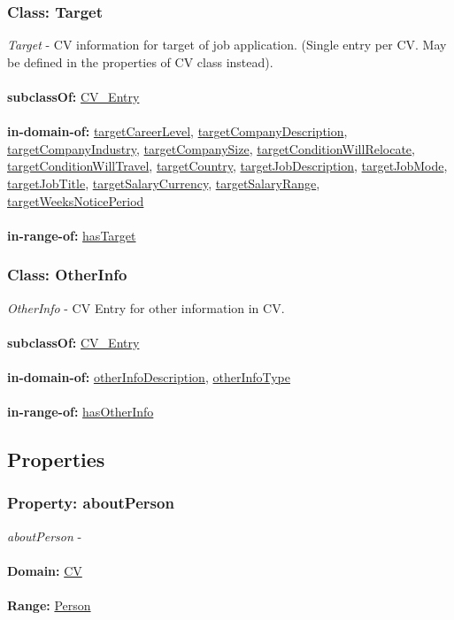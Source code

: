 \documentclass[a4paper,12pt]{article}
\numberwithin{equation}{section}
\begin{document}
\subsubsection{Class: Target}\hypertarget{Target}{}
\textit{Target} - CV information for target of job application. (Single entry per CV. May be defined in the properties of CV class instead).
\\\\
\textbf{subclassOf:} \hyperlink{CV\_Entry}{CV\_Entry}
\\\\
\textbf{in-domain-of:} \hyperlink{targetCareerLevel}{targetCareerLevel}, \hyperlink{targetCompanyDescription}{targetCompanyDescription}, \hyperlink{targetCompanyIndustry}{targetCompanyIndustry}, \hyperlink{targetCompanySize}{targetCompanySize}, \hyperlink{targetConditionWillRelocate}{targetConditionWillRelocate}, \hyperlink{targetConditionWillTravel}{targetConditionWillTravel}, \hyperlink{targetCountry}{targetCountry}, \hyperlink{targetJobDescription}{targetJobDescription}, \hyperlink{targetJobMode}{targetJobMode}, \hyperlink{targetJobTitle}{targetJobTitle}, \hyperlink{targetSalaryCurrency}{targetSalaryCurrency}, \hyperlink{targetSalaryRange}{targetSalaryRange}, \hyperlink{targetWeeksNoticePeriod}{targetWeeksNoticePeriod}
\\\\
\textbf{in-range-of:} \hyperlink{hasTarget}{hasTarget}

\subsubsection{Class: OtherInfo}\hypertarget{OtherInfo}{}
\textit{OtherInfo} - CV Entry for other information in CV.
\\\\
\textbf{subclassOf:} \hyperlink{CV\_Entry}{CV\_Entry}
\\\\
\textbf{in-domain-of:} \hyperlink{otherInfoDescription}{otherInfoDescription}, \hyperlink{otherInfoType}{otherInfoType}
\\\\
\textbf{in-range-of:} \hyperlink{hasOtherInfo}{hasOtherInfo}

\subsection{Properties}
\subsubsection{Property: aboutPerson}\hypertarget{aboutPerson}{}
\textit{aboutPerson} - 
\\\\
\textbf{Domain:} \hyperlink{CV}{CV} 
\\\\
\textbf{Range:}  \hyperlink{Person}{Person} 
\end{document}
